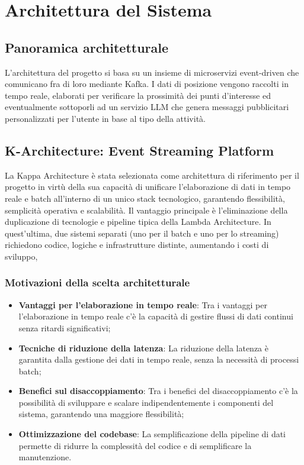 \documentclass[10pt]{article}
\begin{document}
\newpage
\section{Architettura del Sistema}

\subsection{Panoramica architetturale}
L'architettura del progetto si basa su un insieme di microservizi event-driven che comunicano fra di loro mediante Kafka. I dati di posizione vengono raccolti in tempo reale, elaborati per verificare la prossimità dei punti d'interesse ed eventualmente sottoporli ad un servizio LLM che genera messaggi pubblicitari personalizzati per l'utente in base al tipo della attività.

\subsection{K-Architecture: Event Streaming Platform}
La Kappa Architecture è stata selezionata come architettura di riferimento per il progetto in virtù della sua capacità di unificare l’elaborazione di dati in tempo reale e batch all’interno di un unico stack tecnologico, garantendo flessibilità, semplicità operativa e scalabilità. Il vantaggio principale è l’eliminazione della duplicazione di tecnologie e pipeline tipica della Lambda Architecture. In quest’ultima, due sistemi separati (uno per il batch e uno per lo streaming) richiedono codice, logiche e infrastrutture distinte, aumentando i costi di sviluppo,
    \subsubsection{Motivazioni della scelta architetturale}
        \begin{itemize}
        \item \textbf{Vantaggi per l'elaborazione in tempo reale}: Tra i vantaggi per l'elaborazione in tempo reale c'è la capacità di gestire flussi di dati continui senza ritardi significativi;
        \item \textbf{Tecniche di riduzione della latenza}: La riduzione della latenza è garantita dalla gestione dei dati in tempo reale, senza la necessità di processi batch;
        \item \textbf{Benefici sul disaccoppiamento}: Tra i benefici del disaccoppiamento c'è la possibilità di sviluppare e scalare indipendentemente i componenti del sistema, garantendo una maggiore flessibilità;
        \item \textbf{Ottimizzazione del codebase}: La semplificazione della pipeline di dati permette di ridurre la complessità del codice e di semplificare la manutenzione.
    \end{itemize}
\end{document}
